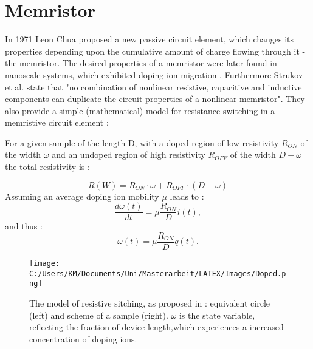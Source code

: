 \documentclass[12pt]{article}
\begin{document}
\normalsize	
		\section{Memristor}
		\label{sec:Memristor}
	In 1971 Leon Chua proposed a new passive circuit element, which changes its properties depending upon the cumulative amount of charge flowing through it - the memristor\cite{Missing}. The desired properties of a memristor were later found in nanoscale systems, which exhibited doping ion migration \cite{Missing}. Furthermore Strukov et al.\cite{Missing} state that "no combination of nonlinear resistive, capacitive and inductive components can duplicate the circuit properties of a nonlinear memristor". They also provide a simple (mathematical)
model for resistance switching in a memristive circuit element :

For a given sample of the length D, with a doped region of low resistivity \(R_{ON}\) of the width $\omega$ and an undoped region of high resistivity \(R_{OFF}\) of the width \(D-\omega\) the total resistivity is : 

\begin{equation}
R(W) = R_{ON}\cdot\omega+R_{OFF}\cdot(D-\omega)
\end{equation} 
Assuming an average doping ion mobility $\mu$ leads to :
\begin{equation}
\frac{d\omega (t)}{dt} = \mu \frac{R_{ON}}{D}i(t),
\end{equation}
and thus :
\begin{equation}
\omega (t) = \mu \frac{R_{ON}}{D}q(t).
\end{equation}

\begin{figure}[htb]
	\centering
		\texttt{[image: C:/Users/KM/Documents/Uni/Masterarbeit/LATEX/Images/Doped.png]}
	\label{fig:Doped}
	\caption{The model of resistive sitching, as proposed in \cite{Missing}: equivalent circle (left) and scheme of a sample (right). $\omega$ is the state variable, reflecting the fraction of device length,which experiences a increased concentration of doping ions.}
\end{figure}


\end{document}
